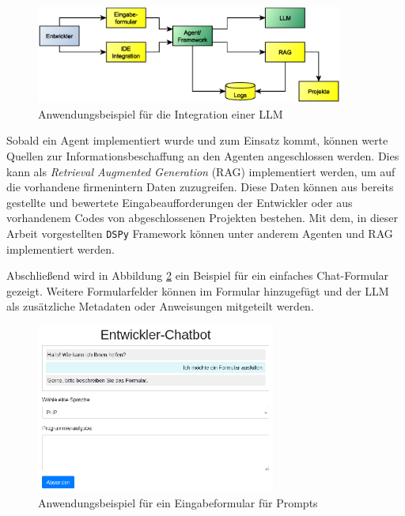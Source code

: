 \begin{figure}[!ht]
	\includegraphics[width=0.9\textwidth]{content/chapter_discussion/images/anwendungsbeispiel.eps}
	\centering
	\caption{Anwendungsbeispiel für die Integration einer LLM}
	\label{img:example_firm_integration}
\end{figure}

Sobald ein Agent implementiert wurde und zum Einsatz kommt, können werte Quellen zur Informationsbeschaffung an den Agenten angeschlossen werden. Dies kann als \textit{Retrieval Augmented Generation} (\acrshort{RAG}) implementiert werden, um auf die vorhandene firmenintern Daten zuzugreifen. Diese Daten können aus bereits gestellte und bewertete Eingabeaufforderungen der Entwickler oder aus vorhandenem Codes von abgeschlossenen Projekten bestehen. Mit dem, in dieser Arbeit vorgestellten \texttt{DSPy} Framework können unter anderem Agenten und RAG implementiert werden.\vspace{0.2cm}

Abschließend wird in Abbildung \ref{img:example_chat_form} ein Beispiel für ein einfaches Chat-Formular gezeigt. Weitere Formularfelder können im Formular hinzugefügt und der LLM als zusätzliche Metadaten oder Anweisungen mitgeteilt werden.\vspace{0.2cm}

\begin{figure}[!ht]
	\includegraphics[width=0.7\textwidth]{content/chapter_discussion/images/chatbot_form_example.eps}
	\centering
	\caption{Anwendungsbeispiel für ein Eingabeformular für Prompts}
	\label{img:example_chat_form}
\end{figure}

